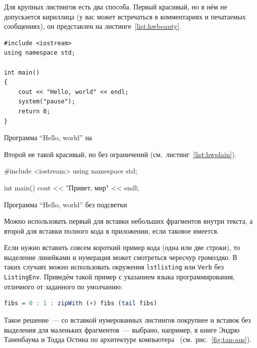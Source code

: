 Для крупных листингов есть два способа. Первый красивый, но в нём не допускается
кириллица (у вас может встречаться в комментариях и
печатаемых сообщениях), он представлен на листинге~\ref{list:hwbeauty}.
\begin{ListingEnv}[H]%
\begin{lstlisting}
#include <iostream>
using namespace std;

int main()
{
    cout << "Hello, world" << endl;
    system("pause");
    return 0;
}
\end{lstlisting}
\caption{Программа “Hello, world” на \protect\cpp}
\label{list:hwbeauty}
\end{ListingEnv}

Второй не такой красивый, но без ограничений (см.~листинг~\ref{list:hwplain}).
\begin{ListingEnv}[H]
\begin{Verb}

#include <iostream>
using namespace std;

int main()
{
    cout << "Привет, мир" << endl;
}
\end{Verb}
\caption{Программа “Hello, world” без подсветки}
\label{list:hwplain}
\end{ListingEnv}

Можно использовать первый для вставки небольших фрагментов
внутри текста, а второй для вставки полного
кода в приложении, если таковое имеется.

Если нужно вставить совсем короткий пример кода (одна или две строки), то выделение  линейками и нумерация может смотреться чересчур громоздко. В таких случаях можно использовать окружения \texttt{lstlisting} или \texttt{Verb} без \texttt{ListingEnv}. Приведём такой пример с указанием языка программирования, отличного от заданного по умолчанию:
\begin{lstlisting}[language=Haskell]
fibs = 0 : 1 : zipWith (+) fibs (tail fibs)
\end{lstlisting}
Такое решение~--- со вставкой нумерованных листингов покрупнее
и вставок без выделения для маленьких фрагментов~--- выбрано,
например, в книге Эндрю Таненбаума и Тодда Остина по архитектуре
компьютера~\autocite{TanAus2013} (см.~рис.~\ref{fig:tan-aus}).

